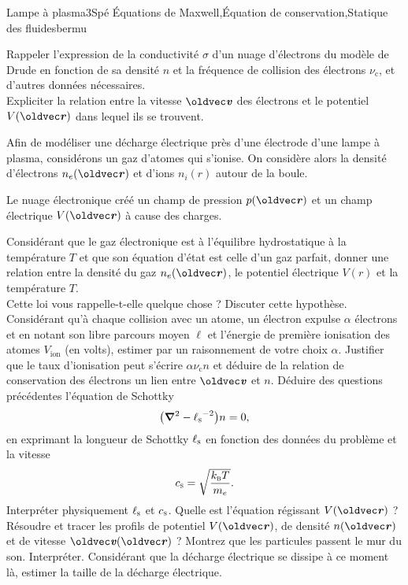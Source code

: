 
\begin{exercise}{Lampe à plasma}{3}{Spé}
{\'Equations de Maxwell,\'Equation de conservation,Statique des fluides}{bermu}

\begin{questions}
    \questioncours Rappeler l'expression de la conductivité $\sigma$ d'un nuage d'électrons du modèle de Drude en fonction de sa densité $n$ et la fréquence de collision des électrons $\nu_\text{c}$, et d'autres données nécessaires. \\
    Expliciter la relation entre la vitesse $\vv$ des électrons et le potentiel $V(\vr)$ dans lequel ils se trouvent.
\begin{EnvUplevel}
Afin de modéliser une décharge électrique près d'une électrode d'une lampe à plasma, considérons un gaz d'atomes qui s'ionise. On considère alors la densité d'électrons $n_e(\vr)$ et d'ions $n_i(r)$ autour de la boule.

Le nuage électronique créé un champ de pression $p(\vr)$ et un champ électrique $V(\vr)$ à cause des charges.
\end{EnvUplevel}
    \question Considérant que le gaz électronique est à l'équilibre hydrostatique à la température $T$ et que son équation d'état est celle d'un gaz parfait, donner une relation entre la densité du gaz $n_e(\vr)$, le potentiel électrique $V(r)$ et la température $T$. \\
    Cette loi vous rappelle-t-elle quelque chose ? Discuter cette hypothèse.
    \question Considérant qu'à chaque collision avec un atome, un électron expulse $\alpha$ électrons et en notant son libre parcours moyen $\ell$ et l'énergie de première ionisation des atomes $V_\text{ion}$ (en volts), estimer par un raisonnement de votre choix $\alpha$.
    \question Justifier que le taux d'ionisation peut s'écrire $\alpha\nu_\text{c}n$ et déduire de la relation de conservation des électrons un lien entre $\vv$ et $n$.
    \question Déduire des questions précédentes l'équation de Schottky
    $$\qty(\grad^2 - {\ell_\textsc{s}}^{-2})n = 0,$$
    en exprimant la longueur de Schottky $\ell_\textsc{s}$ en fonction des données du problème et la vitesse
    $$c_\textsc{s} = \sqrt{\dfrac{k_\textsc{b}T}{m_e}}.$$
    Interpréter physiquement $\ell_\textsc{s}$ et $c_\textsc{s}$.
    \question Quelle est l'équation régissant $V(\vr)$ ?
    \question Résoudre et tracer les profils de potentiel $V(\vr)$, de densité $n(\vr)$ et de vitesse $\vv(\vr)$ ?
    \question Montrez que les particules passent le mur du son. Interpréter. Considérant que la décharge électrique se dissipe à ce moment là, estimer la taille de la décharge électrique.
\end{questions}


\end{exercise}
